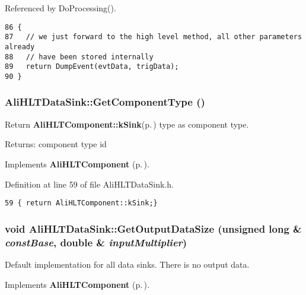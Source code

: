 Referenced by Do\-Processing().

\footnotesize\begin{verbatim}86 {
87   // we just forward to the high level method, all other parameters already
88   // have been stored internally
89   return DumpEvent(evtData, trigData);
90 }
\end{verbatim}\normalsize 


\subsubsection{ Ali\-HLTData\-Sink::Get\-Component\-Type ()\hspace{0.3cm}{\tt  [inline, virtual]}}\label{classAliHLTDataSink_a3}


Return {\bf Ali\-HLTComponent::k\-Sink}{\rm (p.\,\pageref{classAliHLTComponent_w9w3})} type as component type. \begin{Desc}
\item[Returns:]component type id \end{Desc}


Implements {\bf Ali\-HLTComponent} {\rm (p.\,\pageref{classAliHLTComponent_a8})}.

Definition at line 59 of file Ali\-HLTData\-Sink.h.

\footnotesize\begin{verbatim}59 { return AliHLTComponent::kSink;}
\end{verbatim}\normalsize 


\subsubsection{\setlength{\rightskip}{0pt plus 5cm}void Ali\-HLTData\-Sink::Get\-Output\-Data\-Size (unsigned long \& {\em const\-Base}, double \& {\em input\-Multiplier})\hspace{0.3cm}{\tt  [virtual]}}\label{classAliHLTDataSink_a5}


Default implementation for all data sinks. There is no output data. 

Implements {\bf Ali\-HLTComponent} {\rm (p.\,\pageref{classAliHLTComponent_a12})}.

